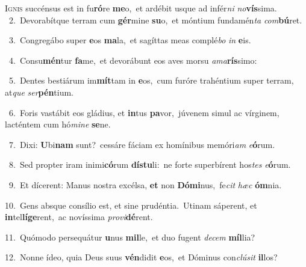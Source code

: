 \lettrine{\initial\textcolor{\initialcolor}{I}}{gnis} succénsus est in fu\-\textbf{ró}\-re \textbf{me}\-o,~\star et ardébit usque ad infér\textit{ni} \textit{no}\-\textbf{vís}sima.\\
{\numbfont\textcolor{\numbcolor}{~2.}}~Devorabítque terram cum \textbf{gér}\-mine \textbf{su}\-o,~\star et móntium fundamén\textit{ta} \textit{com}\-\textbf{bú}ret.\par
{\numbfont\textcolor{\numbcolor}{~3.}}~Congregábo super \textbf{e}\-os \textbf{ma}\-la,~\star et sagíttas meas complé\textit{bo} \textit{in} \textbf{e}\-is.\par
{\numbfont\textcolor{\numbcolor}{~4.}}~Consu\-\textbf{mén}\-tur \textbf{fa}\-me,~\star et devorábunt eos aves morsu \textit{a}\-\textit{ma}\textbf{rís}simo:\par
{\numbfont\textcolor{\numbcolor}{~5.}}~Dentes bestiárum im\-\textbf{mít}\-tam in \textbf{e}\-os,~\star cum furóre trahéntium super terram, at\textit{que} \textit{ser}\-\textbf{pén}tium.\par
{\numbfont\textcolor{\numbcolor}{~6.}}~Foris vastábit eos gládius, et \textbf{in}\-tus \textbf{pa}\-vor,~\star júvenem simul ac vírginem, lacténtem cum hó\-\textit{mi}\-\textit{ne} \textbf{se}\-ne.\par
{\numbfont\textcolor{\numbcolor}{~7.}}~Dixi: \textbf{U}\-bi\textbf{nam} sunt?~\star cessáre fáciam ex homínibus memóri\textit{am} \textit{e}\-\textbf{ó}rum.\par
{\numbfont\textcolor{\numbcolor}{~8.}}~Sed propter iram inimi\-\textbf{có}\-rum \textbf{dís}\-\textbf{tu}li:~\star ne forte superbírent hos\textit{tes} \textit{e}\-\textbf{ó}rum.\par
{\numbfont\textcolor{\numbcolor}{~9.}}~Et dícerent: Manus nostra excélsa, \textbf{et} non \textbf{Dó}\-\textbf{mi}nus,~\star fe\textit{cit} \textit{hæc} \textbf{óm}\-nia.\par
{\numbfont\textcolor{\numbcolor}{10.}}~Gens absque consílio est, et sine prudéntia.~\dagger Utinam sáperent, et \textbf{in}\-tel\-\textbf{lí}\-\textbf{ge}rent,~\star ac novíssima \textit{pro}\-\textit{vi}\textbf{dé}rent.\par
{\numbfont\textcolor{\numbcolor}{11.}}~Quómodo persequátur \textbf{u}\-nus \textbf{mil}\-le,~\star et duo fugent \textit{de}\-\textit{cem} \textbf{míl}\-lia?\par
{\numbfont\textcolor{\numbcolor}{12.}}~Nonne ídeo, quia Deus suus \textbf{vén}\-didit \textbf{e}\-os,~\star et Dóminus con\-\textit{clú}\-\textit{sit} \textbf{il}\-los?\par
